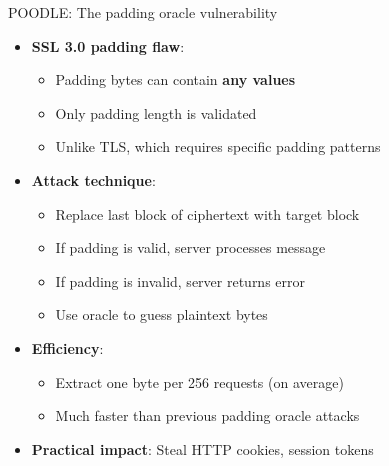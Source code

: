 \documentclass[aspectratio=169, lualatex, handout]{beamer}
\begin{document}
\begin{frame}{POODLE: The padding oracle vulnerability}
	\begin{itemize}
		\item \textbf{SSL 3.0 padding flaw}:
		      \begin{itemize}
			      \item Padding bytes can contain \textbf{any values}
			      \item Only padding length is validated
			      \item Unlike TLS, which requires specific padding patterns
		      \end{itemize}
		\item \textbf{Attack technique}:
		      \begin{itemize}
			      \item Replace last block of ciphertext with target block
			      \item If padding is valid, server processes message
			      \item If padding is invalid, server returns error
			      \item Use oracle to guess plaintext bytes
		      \end{itemize}
		\item \textbf{Efficiency}:
		      \begin{itemize}
			      \item Extract one byte per 256 requests (on average)
			      \item Much faster than previous padding oracle attacks
		      \end{itemize}
		\item \textbf{Practical impact}: Steal HTTP cookies, session tokens
	\end{itemize}
\end{frame}
\end{document}
